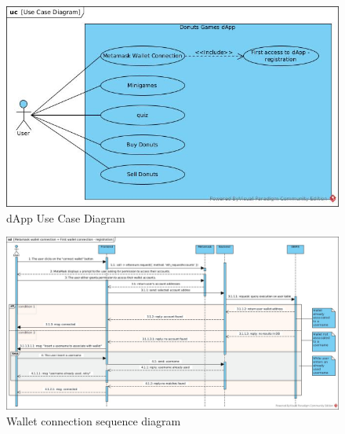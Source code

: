 \documentclass[main.tex]{subfiles}
\begin{document}
 \begin{figure}[htbp] %
    \centering %
    \includegraphics[width=1\textwidth]{src/diagrams/Use Case Diagram.jpg} %
    \caption{dApp Use Case Diagram} %
    \label{fig:useCaseDiag} %
\end{figure}
\begin{figure}[htbp] %
    \centering %
    \includegraphics[width=1\textwidth]{src/diagrams/Metamask wallet connection + First wallet connection - registration.jpg} %
    \caption{Wallet connection sequence diagram} %
    \label{fig:WalletConnect_seqDiag} %
\end{figure}
\end{document}
